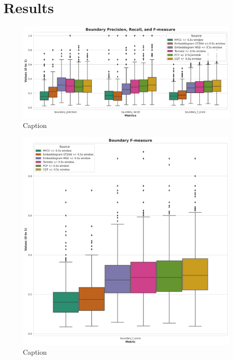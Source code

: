 \chapter{Results}



\begin{figure}
    \centering
    \includegraphics[width=\textwidth]{figures/images/metrics.png}
    \caption{Caption}
    \label{fig:boxplotmetrics}
\end{figure}

\begin{figure}
    \centering
    \includegraphics[width=\textwidth]{figures/images/boudaryfscore.png}
    \caption{Caption}
    \label{fig:boxplotfmeasure}
\end{figure}

\newpage


